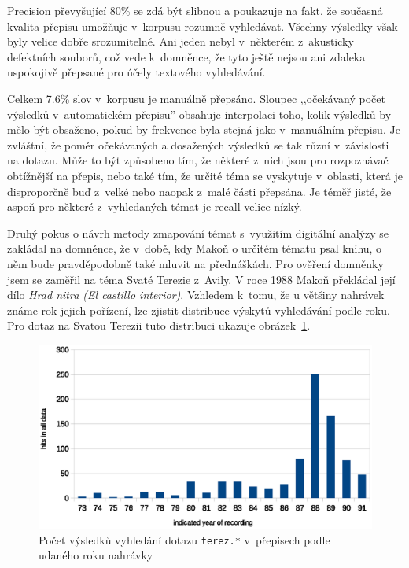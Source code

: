 Precision převyšující 80\% se zdá být slibnou a poukazuje na fakt, že současná
kvalita přepisu umožňuje v~korpusu rozumně vyhledávat. Všechny výsledky však
byly velice dobře srozumitelné. Ani jeden nebyl v~některém z~akusticky
defektních souborů, což vede k~domněnce, že tyto ještě nejsou ani zdaleka
uspokojivě přepsané pro účely textového vyhledávání.

Celkem 7.6\% slov v~korpusu je manuálně přepsáno. Sloupec ,,očekávaný počet
výsledků v~automatickém přepisu'' obsahuje interpolaci toho, kolik výsledků by
mělo být obsaženo, pokud by frekvence byla stejná jako v~manuálním přepisu. Je
zvláštní, že poměr očekávaných a dosažených výsledků se tak různí v~závislosti
na dotazu. Může to být způsobeno tím, že některé z~nich jsou pro rozpoznávač
obtížnější na přepis, nebo také tím, že určité téma se vyskytuje v~oblasti,
která je disproporčně buď z~velké nebo naopak z~malé části přepsána. Je téměř
jisté, že aspoň pro některé z~vyhledaných témat je recall velice nízký.

Druhý pokus o návrh metody zmapování témat s~využitím digitální analýzy se zakládal na
domněnce, že v~době, kdy Makoň o určitém tématu psal knihu, o něm bude
pravděpodobně také mluvit na přednáškách. Pro ověření domněnky jsem se zaměřil
na téma Svaté Terezie z~Avily. V roce 1988 Makoň překládal její dílo {\em Hrad nitra
(El castillo interior)}. Vzhledem k~tomu, že u většiny nahrávek známe rok jejich
pořízení, lze zjistit distribuce výskytů vyhledávání podle roku. Pro dotaz na
Svatou Terezii tuto distribuci ukazuje obrázek~\ref{fig:teresa-year}.

\begin{figure}[htpb]
\includegraphics[scale=0.9]{rc/teresa-by-year.eps}
\caption{Počet výsledků vyhledání dotazu \texttt{terez.*} v~přepisech podle
udaného roku nahrávky}
\label{fig:teresa-year}
\end{figure}

